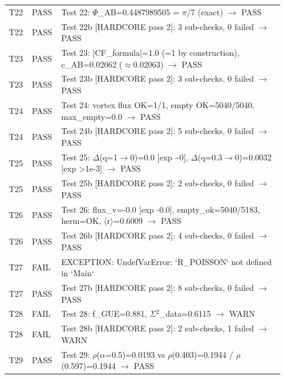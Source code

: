 \documentclass[10pt]{article}
\begin{document}
\begin{longtable}{p{0.06\linewidth} p{0.09\linewidth} p{0.78\linewidth}}
T22 & PASS & Test 22: $\Phi$\_AB=0.4487989505 = $\pi$/7 (exact) $\rightarrow$ PASS \\

T22 & PASS & Test 22b [HARDCORE pass 2]: 3 sub-checks, 0 failed $\rightarrow$ PASS \\

T23 & PASS & Test 23: |CF\_formula|=1.0 (=1 by construction), c\_AB=0.02062 ($\approx$0.02063) $\rightarrow$ PASS \\

T23 & PASS & Test 23b [HARDCORE pass 2]: 3 sub-checks, 0 failed $\rightarrow$ PASS \\

T24 & PASS & Test 24: vortex flux OK=1/1, empty OK=5040/5040, max\_empty=0.0 $\rightarrow$ PASS \\

T24 & PASS & Test 24b [HARDCORE pass 2]: 5 sub-checks, 0 failed $\rightarrow$ PASS \\

T25 & PASS & Test 25: $\Delta$(q=1$\rightarrow$0)=0.0 [exp \textasciitilde{}0], $\Delta$(q=0.3$\rightarrow$0)=0.0032 [exp >1e-3] $\rightarrow$ PASS \\

T25 & PASS & Test 25b [HARDCORE pass 2]: 2 sub-checks, 0 failed $\rightarrow$ PASS \\

T26 & PASS & Test 26: flux\_v=-0.0 [exp -0.0], empty\_ok=5040/5183, herm=OK, $\langle$r$\rangle$=0.6009 $\rightarrow$ PASS \\

T26 & PASS & Test 26b [HARDCORE pass 2]: 4 sub-checks, 0 failed $\rightarrow$ PASS \\

T27 & FAIL & EXCEPTION: UndefVarError: `R\_POISSON` not defined in `Main` \\

T27 & PASS & Test 27b [HARDCORE pass 2]: 8 sub-checks, 0 failed $\rightarrow$ PASS \\

T28 & FAIL & Test 28: f\_GUE=0.881, $\Sigma$$^2$\_data=0.6115 $\rightarrow$ WARN \\

T28 & FAIL & Test 28b [HARDCORE pass 2]: 2 sub-checks, 1 failed $\rightarrow$ WARN \\

T29 & PASS & Test 29: $\rho$($\alpha$=0.5)=0.0193 vs $\rho$(0.403)=0.1944 / $\rho$(0.597)=0.1944 $\rightarrow$ PASS \\


\end{longtable}
\end{document}
